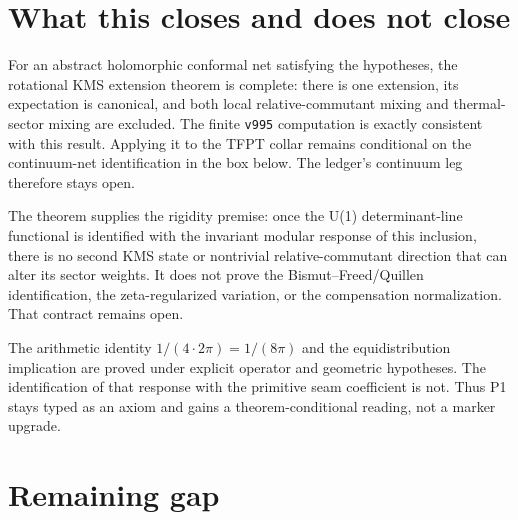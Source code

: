 \section{What this closes and does not close}

\begin{description}[style=nextline]
\item[\texttt{SEAM.STATE.RPMIXING.01}, continuum leg.]
For an abstract holomorphic conformal net satisfying the hypotheses,
the rotational KMS extension theorem is complete: there is one
extension, its expectation is canonical, and both local
relative-commutant mixing and thermal-sector mixing are excluded.
The finite \texttt{v995} computation is exactly consistent with this
result.  Applying it to the TFPT collar remains conditional on the
continuum-net identification in the box below.  The ledger's
continuum leg therefore stays open.

\item[\texttt{ALPHA.QUILLEN.EXACT.01}.]
The theorem supplies the rigidity premise: once the U(1)
determinant-line functional is identified with the invariant modular
response of this inclusion, there is no second KMS state or
nontrivial relative-commutant direction that can alter its sector
weights.  It does not prove the Bismut--Freed/Quillen identification,
the zeta-regularized variation, or the compensation normalization.
That contract remains open.

\item[\texttt{AX.P1.01}.]
The arithmetic identity
$1/(4\cdot2\pi)=1/(8\pi)$ and the equidistribution implication are
proved under explicit operator and geometric hypotheses.
The identification of that response with the primitive seam
coefficient is not.  Thus P1 stays typed as an axiom and gains a
theorem-conditional reading, not a marker upgrade.
\end{description}

\section{Remaining gap}

